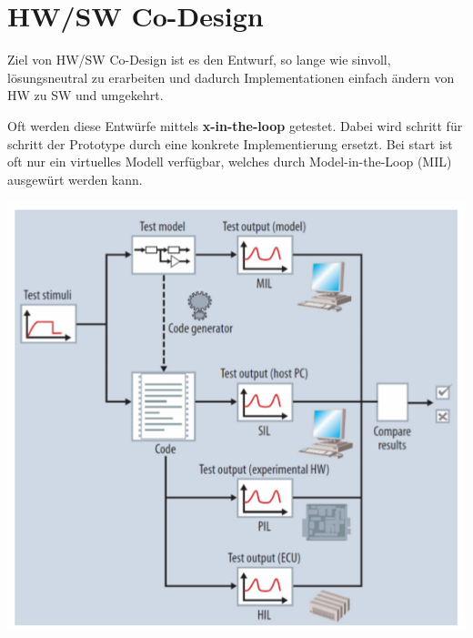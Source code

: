 \section{HW/SW Co-Design}
Ziel von HW/SW Co-Design ist es den Entwurf, so lange wie sinvoll, lösungsneutral zu erarbeiten und dadurch Implementationen einfach ändern von HW zu SW und umgekehrt.

Oft werden diese Entwürfe mittels \textbf{x-in-the-loop} getestet. Dabei wird schritt für schritt der Prototype durch eine konkrete Implementierung ersetzt. Bei start ist oft nur ein virtuelles Modell verfügbar, welches durch Model-in-the-Loop (MIL) ausgewürt werden kann.
\begin{center}
	\includegraphics[width=\columnwidth]{Images/model-in-the-loop}
\end{center}
